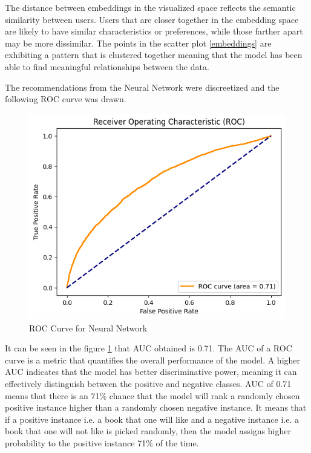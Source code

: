 The distance between embeddings in the visualized space reflects the semantic similarity between users. Users that are closer together in the embedding space are likely to have similar characteristics or preferences, while those farther apart may be more dissimilar. The points in the scatter plot \ref{embeddings} are exhibiting a pattern that is clustered together meaning that the model has been able to find meaningful relationships between the data.

The recommendations from the Neural Network were discreetized and the following ROC curve was drawn.

\begin{figure}[h]
        \centering
        \includegraphics[width=1\linewidth]{img/Graphics/roc_nn.png}
        \caption{ROC Curve for Neural Network}
        \label{roc-nn}
    \end{figure}

    \newpage
It can be seen in the figure \ref{roc-nn} that AUC obtained is 0.71. The AUC of a ROC curve is a metric that quantifies the overall performance of the model. A higher AUC indicates that the model has better discriminative power, meaning it can effectively distinguish between the positive and negative classes. AUC of 0.71 means that there is an 71\% chance that the model will rank a randomly chosen positive instance higher than a randomly chosen negative instance. It means that if a positive instance i.e. a book that one will like and a negative instance i.e. a book that one will not like is picked randomly, then the model assigns higher probability to the positive instance 71\% of the time.

